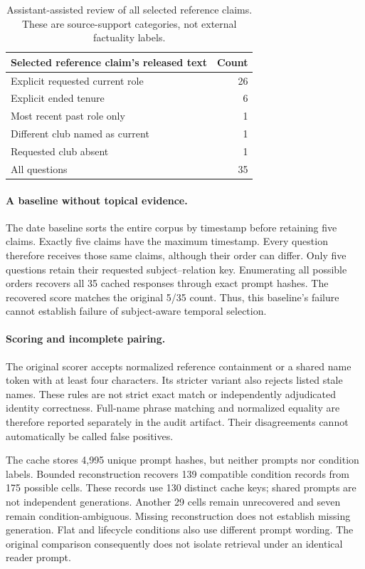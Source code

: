 \documentclass[11pt]{article}
\begin{document}
\begin{table}[t]
\centering
\small
\begin{tabular}{lr}
\toprule
Selected reference claim's released text & Count \\
\midrule
Explicit requested current role & 26 \\
Explicit ended tenure & 6 \\
Most recent past role only & 1 \\
Different club named as current & 1 \\
Requested club absent & 1 \\
\midrule
All questions & 35 \\
\bottomrule
\end{tabular}
\caption{Assistant-assisted review of all selected reference claims. These are source-support categories, not external factuality labels.}
\label{tab:support}
\end{table}

\paragraph{A baseline without topical evidence.}
The date baseline sorts the entire corpus by timestamp before retaining five claims.
Exactly five claims have the maximum timestamp.
Every question therefore receives those same claims, although their order can differ.
Only five questions retain their requested subject--relation key.
Enumerating all possible orders recovers all 35 cached responses through exact prompt hashes.
The recovered score matches the original 5/35 count.
Thus, this baseline's failure cannot establish failure of subject-aware temporal selection.

\paragraph{Scoring and incomplete pairing.}
The original scorer accepts normalized reference containment or a shared name token with at least four characters.
Its stricter variant also rejects listed stale names.
These rules are not strict exact match or independently adjudicated identity correctness.
Full-name phrase matching and normalized equality are therefore reported separately in the audit artifact.
Their disagreements cannot automatically be called false positives.

The cache stores 4,995 unique prompt hashes, but neither prompts nor condition labels.
Bounded reconstruction recovers 139 compatible condition records from 175 possible cells.
These records use 130 distinct cache keys; shared prompts are not independent generations.
Another 29 cells remain unrecovered and seven remain condition-ambiguous.
Missing reconstruction does not establish missing generation.
Flat and lifecycle conditions also use different prompt wording.
The original comparison consequently does not isolate retrieval under an identical reader prompt.
\end{document}

